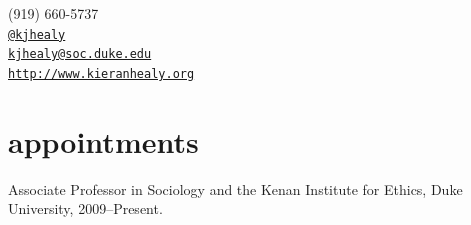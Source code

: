 \documentclass[11pt,oneside,a4paper,DIV=8]{scrartcl}
\makeatletter
\def\myemail{kjhealy@soc.duke.edu}
\def\myweb{http://www.kieranhealy.org}
\def\myphone{(919) 660-5737}
\def\mytwitter{@kjhealy}
\makeatother
\begin{document}

\ohead[]{\textsc{\thepage}}
\cfoot[\textsc{\thepage}]{}


\pagestyle{scrheadings}
\thispagestyle{plain.scrheadings}


\begin{minipage}[t]{2.95in}
  
\end{minipage}
\hfill     
\hfill
\begin{minipage}[t]{1.3in}
  \flushright \footnotesize  \addressblock \myphone \, \faPhone \\ 
  {\scriptsize  \texttt{\href{http://twitter.com/kjhealy}{\mytwitter}} \, \faTwitter }  \\ 
  {\scriptsize  \texttt{\href{mailto:\myemail}{\myemail}} \, \faEnvelope} \\
  {\scriptsize  \texttt{\href{\myweb}{\myweb}} \, \faGlobe}
\end{minipage}



\reversemarginpar

       


% 
\section{appointments}

Associate Professor in Sociology and the Kenan Institute for Ethics, Duke University, 2009--Present.      
\end{document}
